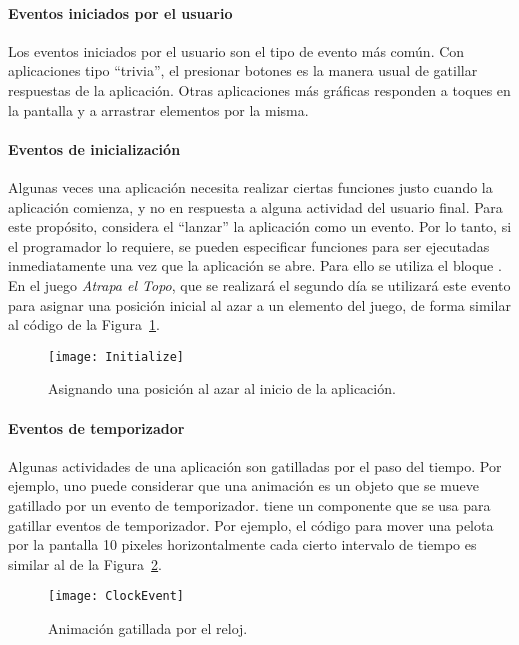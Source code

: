 \paragraph{Eventos iniciados por el usuario} Los eventos iniciados por el usuario son el tipo de evento más común. Con aplicaciones tipo ``trivia'', el presionar botones es la manera usual de gatillar respuestas de la aplicación. Otras aplicaciones más gráficas responden a toques en la pantalla y a arrastrar elementos por la misma.

\paragraph{Eventos de inicialización}
Algunas veces una aplicación necesita realizar ciertas funciones justo cuando la aplicación comienza, y no en respuesta a alguna actividad del usuario final. Para este propósito, \AppInventor considera el ``lanzar'' la aplicación como un evento. Por lo tanto, si el programador lo requiere, se pueden especificar funciones para ser ejecutadas inmediatamente una vez que la aplicación se abre. Para ello se utiliza el bloque . En el juego \emph{Atrapa el Topo}, que se realizará el segundo día se utilizará este evento para asignar una posición inicial al azar a un elemento del juego, de forma similar al código de la Figura~\ref{fig:initialize}.

\begin{figure}[H]
  \centering
  \texttt{[image: Initialize]}
  \caption{Asignando una posición al azar al inicio de la aplicación.}
  \label{fig:initialize}
\end{figure}

\paragraph{Eventos de temporizador}
Algunas actividades de una aplicación son gatilladas por el paso del tiempo. Por ejemplo, uno puede considerar que una animación es un objeto que se mueve gatillado por un evento de temporizador. \AppInventor tiene un componente  que se usa para gatillar eventos de temporizador. Por ejemplo, el código para mover una pelota por la pantalla 10 pixeles horizontalmente cada cierto intervalo de tiempo es similar al de la Figura~\ref{fig:clockEvent}.

\begin{figure}[H]
  \centering
  \texttt{[image: ClockEvent]}
  \caption{Animación gatillada por el reloj.}
  \label{fig:clockEvent}
\end{figure}

